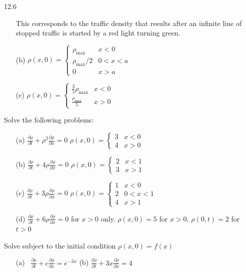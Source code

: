 \begin{exercises}{12.6}
\begin{enumerate}
This corresponds to the traffic density that results after an infinite line of stopped traffic is started by a red light turning green.

\item[(b)] $\rho(x,0) = \begin{cases} \rho_{\max} & x < 0 \\ \rho_{\max}/2 & 0 < x < a \\ 0 & x > a \end{cases}$

\item[(c)] $\rho(x,0) = \begin{cases} \frac{3}{5}\rho_{\max} & x < 0 \\ \frac{\rho_{\max}}{5} & x > 0 \end{cases}$
\end{enumerate}

\item \label{ex:12.6.7}
Solve the following problems:
\begin{enumerate}
\item[(a)] $\frac{\partial\rho}{\partial t} + \rho^2\frac{\partial\rho}{\partial x} = 0$ \quad $\rho(x,0) = \begin{cases} 3 & x < 0 \\ 4 & x > 0 \end{cases}$

\item[(b)] $\frac{\partial\rho}{\partial t} + 4\rho\frac{\partial\rho}{\partial x} = 0$ \quad $\rho(x,0) = \begin{cases} 2 & x < 1 \\ 3 & x > 1 \end{cases}$

\item[(c)] $\frac{\partial\rho}{\partial t} + 3\rho\frac{\partial\rho}{\partial x} = 0$ \quad $\rho(x,0) = \begin{cases} 1 & x < 0 \\ 2 & 0 < x < 1 \\ 4 & x > 1 \end{cases}$

\item[(d)] $\frac{\partial\rho}{\partial t} + 6\rho\frac{\partial\rho}{\partial x} = 0$ for $x > 0$ only. \quad $\rho(x,0) = 5$ for $x > 0$, $\rho(0,t) = 2$ for $t > 0$
\end{enumerate}

\item \label{ex:12.6.8}
Solve subject to the initial condition $\rho(x,0) = f(x)$
\begin{enumerate}
\item[(a)]\starred\ $\frac{\partial\rho}{\partial t} + c\frac{\partial\rho}{\partial x} = e^{-3x}$ \hfill (b) $\frac{\partial\rho}{\partial t} + 3x\frac{\partial\rho}{\partial x} = 4$


\end{enumerate}
\end{exercises}
